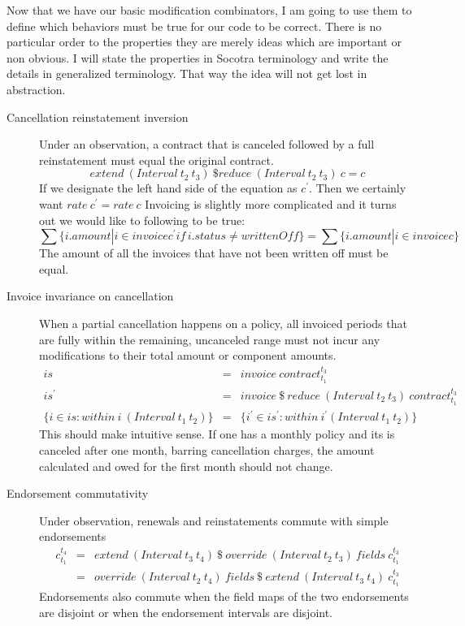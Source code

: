 Now that we have our basic modification combinators, I am going to use them to define which behaviors must be true
for our code to be correct. There is no particular order to the properties they are merely ideas which are important
or non obvious. I will state the properties in Socotra terminology and write the details in generalized terminology.
That way the idea will not get lost in abstraction.

\begin{description}

\item[Cancellation reinstatement inversion]
Under an observation, a contract that is canceled followed by a full reinstatement must
equal the original contract.
\begin{equation*}
extend \: (Interval \: t_2 \: t_3) \: \$ reduce \: (Interval \: t_2 \: t_3) \: c = c
\end{equation*}
If we designate the left hand side of the equation as $c^\prime$. Then we certainly want $rate \: c^\prime = rate \: c$
Invoicing is slightly more complicated and it turns out we would like to following to be true:
\begin{equation*}
\sum \{i.amount | i \in invoice c^\prime if \, i.status \neq writtenOff\} = \sum \{i.amount | i \in invoice c\}
\end{equation*}
The amount of all the invoices that have not been written off must be equal.

\item[Invoice invariance on cancellation]
When a partial cancellation happens on a policy, all invoiced periods that are fully within the remaining,
uncanceled range must not incur any modifications to their total amount or component amounts.
\begin{eqnarray*}
is & = & invoice \: contract_{t_1}^{t_3} \\
is^\prime & = & invoice \: \$ \: reduce \: (Interval \: t_2 \: t_3) \: contract_{t_1}^{t_3} \\
\{i \in is : within \: i \: (Interval \: t_1 \: t_2)\} & = & \{i^\prime \in is^\prime : within \: i^\prime (Interval \: t_1 \: t_2)\}
\end{eqnarray*}
This should make intuitive sense. If one has a monthly policy and its is canceled after one month, barring cancellation charges,
the amount calculated and owed for the first month should not change.

\item[Endorsement commutativity] Under observation, renewals and reinstatements commute with simple endorsements
\begin{eqnarray*}
c_{t_1}^{t_4} & = & extend \: (Interval \: t_3 \: t_4) \: \$ \: override \: (Interval \: t_2 \: t_3) \: fields \: c_{t_1}^{t_3} \\
            & = & override \: (Interval \: t_2 \: t_4) \: fields \: \$ \: extend \: (Interval \: t_3 \: t_4) \: c_{t_1}^{t_3}
\end{eqnarray*}
Endorsements also commute when the field maps of the two endorsements are disjoint or when the endorsement intervals are
disjoint.

\end{description}

